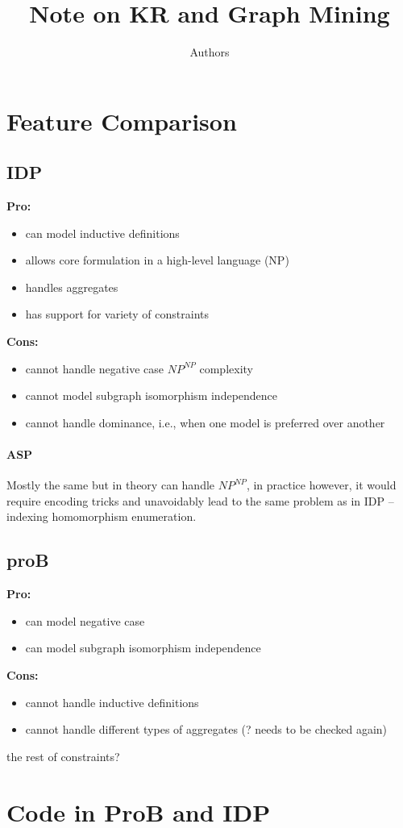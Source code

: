 \documentclass{article}
\author{Authors}
\title{Note on KR and Graph Mining}
\begin{document}
\maketitle
\section{Feature Comparison}

\subsection{IDP} 

\textbf{Pro:}
\begin{itemize}
  \item can model inductive definitions
  \item allows core formulation in a high-level language (NP)
  \item handles aggregates
  \item has support for variety of constraints
\end{itemize}
\textbf{Cons:}
\begin{itemize}
  \item cannot handle negative case $\textit{NP}^\textit{NP}$ complexity
  \item cannot model subgraph isomorphism independence
  \item cannot handle dominance, i.e., when one model is preferred over another 
\end{itemize}

\paragraph{ASP}
Mostly the same but in theory can handle $\textit{NP}^\textit{NP}$, in practice however, it would require encoding tricks and unavoidably lead to the same problem as in IDP -- indexing homomorphism enumeration.

\subsection{proB}
\textbf{Pro:}
\begin{itemize}
  \item can model negative case
  \item can model subgraph isomorphism independence
\end{itemize}
\textbf{Cons:}
\begin{itemize}
  \item cannot handle inductive definitions
  \item cannot handle different types of aggregates (? needs to be checked again)
\end{itemize}

the rest of constraints? 

\section{Code in ProB and IDP}

\pagebreak

\end{document}
